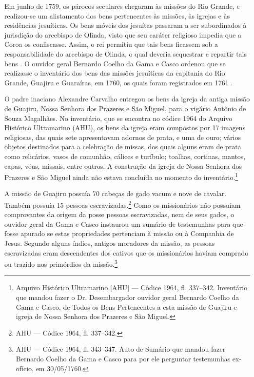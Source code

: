 Em junho de 1759, os párocos seculares chegaram às missões do Rio Grande, e realizou-se um alistamento dos bens pertencentes às missões, às igrejas e às residências jesuíticas. Os bens móveis dos jesuítas passaram a ser subordinados à jurisdição do arcebispo de Olinda, visto que seu caráter religioso impedia que a Coroa os confiscasse. Assim, o rei permitiu que tais bens ficassem sob a responsabilidade do arcebispo de Olinda, o qual deveria sequestrar e repartir tais bens \cite[p.~29--35]{Couto1990}. O ouvidor geral Bernardo Coelho da Gama e Casco ordenou que se realizasse o inventário dos bens das missões jesuíticas da capitania do Rio Grande, Guajiru e Guaraíras, em 1760, os quais foram registrados em 1761 \cite[p.~172]{Lopes2005}. 

O padre inaciano Alexandre Carvalho entregou os bens da igreja da antiga missão de Guajiru, Nossa Senhora dos Prazeres e São Miguel, para o vigário Antônio de Souza Magalhães. No inventário, que se encontra no códice 1964 do Arquivo Histórico Ultramarino (AHU), os bens da igreja eram compostos por 17 imagens religiosas, das quais sete apresentavam adornos de prata, e uma de ouro; vários objetos destinados para a celebração de missas, dos quais alguns eram de prata como relicários, vasos de comunhão, cálices e turíbulo; toalhas, cortinas, mantos, capas, véus, missais, entre outros. A construção da igreja de Nossa Senhora dos Prazeres e São Miguel ainda não estava concluída no momento do inventário.\footnote{Arquivo Histórico Ultramarino [AHU] --- Códice 1964, fl. 337--342. Inventário que mandou fazer o Dr. Desembargador ouvidor geral Bernardo Coelho da Gama e Casco, de Todos os Bens Pertencentes a esta missão de Guajiru e igreja de Nossa Senhora dos Prazeres e São Miguel.} 

A missão de Guajiru possuía 70 cabeças de gado vacum e nove de cavalar. Também possuía 15 pessoas escravizadas.\footnote{AHU --- Códice 1964, fl. 337--342.} Como os missionários não possuíam comprovantes da origem da posse pessoas escravizadas, nem de seus gados, o ouvidor geral da Gama e Casco instaurou um sumário de testemunhas para que fosse apurado se estas propriedades pertenciam à missão ou à Companhia de Jesus. Segundo alguns índios, antigos moradores da missão, as pessoas escravizadas eram descendentes dos cativos que os missionários haviam comprado ou trazido nos primórdios da missão.\footnote{AHU --- Códice 1964, fl. 343--347. Auto de Sumário que mandou fazer Bernardo Coelho da Gama e Casco para por ele perguntar testemunhas ex-ofício, em 30/05/1760.} 

